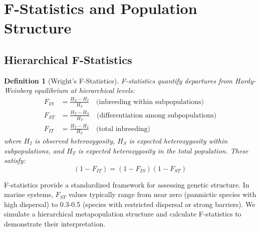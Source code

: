 \documentclass[11pt,a4paper]{article}
\newtheorem{definition}{Definition}[section]
\begin{document}
\section{F-Statistics and Population Structure}

\subsection{Hierarchical F-Statistics}

\begin{definition}[Wright's F-Statistics]
F-statistics quantify departures from Hardy-Weinberg equilibrium at hierarchical levels:
\begin{align}
F_{IS} &= \frac{H_S - H_I}{H_S} \quad \text{(inbreeding within subpopulations)} \\
F_{ST} &= \frac{H_T - H_S}{H_T} \quad \text{(differentiation among subpopulations)} \\
F_{IT} &= \frac{H_T - H_I}{H_T} \quad \text{(total inbreeding)}
\end{align}
where $H_I$ is observed heterozygosity, $H_S$ is expected heterozygosity within subpopulations,
and $H_T$ is expected heterozygosity in the total population. These satisfy:
\begin{equation}
(1 - F_{IT}) = (1 - F_{IS})(1 - F_{ST})
\end{equation}
\end{definition}

F-statistics provide a standardized framework for assessing genetic structure. In marine systems,
$F_{ST}$ values typically range from near zero (panmictic species with high dispersal) to 0.3-0.5
(species with restricted dispersal or strong barriers). We simulate a hierarchical metapopulation
structure and calculate F-statistics to demonstrate their interpretation.
\end{document}
